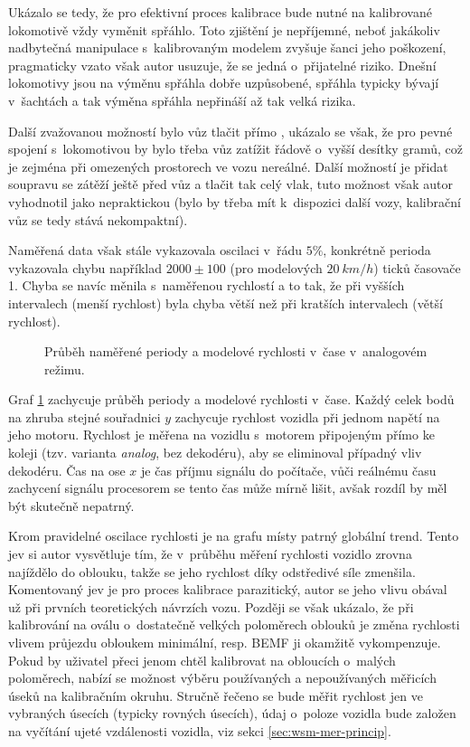 Ukázalo se tedy, že pro efektivní proces kalibrace bude nutné na kalibrované
lokomotivě vždy vyměnit spřáhlo. Toto zjištění je nepříjemné, neboť
jakákoliv nadbytečná manipulace s~kalibrovaným modelem zvyšuje šanci jeho
poškození, pragmaticky vzato však autor usuzuje, že se jedná o~přijatelné
riziko. Dnešní lokomotivy jsou na výměnu spřáhla dobře uzpůsobené, spřáhla
typicky bývají v~šachtách a tak výměna spřáhla nepřináší až tak velká rizika.

Další zvažovanou možností bylo vůz tlačit přímo ,
ukázalo se však, že pro pevné spojení s~lokomotivou by bylo třeba vůz zatížit
řádově o~vyšší desítky gramů, což je zejména při omezených prostorech ve vozu
nereálné. Další možností je přidat soupravu se zátěží ještě před vůz a tlačit
tak celý vlak, tuto možnost však autor vyhodnotil jako nepraktickou (bylo by
třeba mít k~dispozici další vozy, kalibrační vůz se tedy stává nekompaktní).

Naměřená data však stále vykazovala oscilaci v~řádu $5 \%$, konkrétně perioda
vykazovala chybu například $2000 \pm 100$ (pro modelových $20\ km/h$) ticků
časovače 1. Chyba se navíc měnila s~naměřenou rychlostí a to tak, že při
vyšších intervalech (menší rychlost) byla chyba větší než při kratších
intervalech (větší rychlost).

\begin{figure}[h]

\caption{Průběh naměřené periody a modelové rychlosti v~čase v~analogovém
režimu.}
\label{fig:speed-analog}
\end{figure}

Graf \ref{fig:speed-analog} zachycuje průběh periody a modelové rychlosti
v~čase. Každý celek bodů na zhruba stejné souřadnici $y$ zachycuje rychlost
vozidla při jednom napětí na jeho motoru. Rychlost je měřena na vozidlu
s~motorem připojeným přímo ke koleji (tzv. varianta \textit{analog}, bez
dekodéru), aby se eliminoval případný vliv dekodéru. Čas na ose $x$ je čas
příjmu signálu do počítače, vůči reálnému času zachycení signálu procesorem se
tento čas může mírně lišit, avšak rozdíl by měl být skutečně nepatrný.

Krom pravidelné oscilace rychlosti je na grafu místy patrný globální
 trend. Tento jev si autor vysvětluje tím, že v~průběhu měření
rychlosti vozidlo zrovna najíždělo do oblouku, takže se jeho rychlost díky
odstředivé síle zmenšila. Komentovaný jev je pro proces kalibrace parazitický,
autor se jeho vlivu obával už při prvních teoretických návrzích vozu. Později
se však ukázalo, že při kalibrování na oválu o~dostatečně velkých poloměrech
oblouků je změna rychlosti vlivem průjezdu obloukem minimální, resp. BEMF ji
okamžitě vykompenzuje. Pokud by uživatel přeci jenom chtěl kalibrovat na
obloucích o~malých poloměrech, nabízí se možnost výběru používaných a
nepoužívaných měřicích úseků na kalibračním okruhu. Stručně řečeno se bude
měřit rychlost jen ve vybraných úsecích (typicky rovných úsecích), údaj
o~poloze vozidla bude založen na vyčítání ujeté vzdálenosti vozidla, viz sekci
\ref{sec:wsm-mer-princip}.

